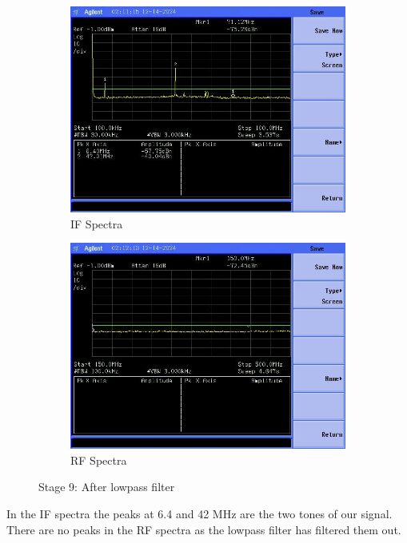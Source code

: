 \documentclass[letterpaper,12pt]{article}
\begin{document}
\begin{figure}[H]
	\begin{subfigure}[t]{.49\textwidth}
		\centering
		\includegraphics[width=\linewidth]{figures/receiver_spectra/9.lpf.lower}
		\caption{IF Spectra}
	  \end{subfigure}
	  \hfill
	  \begin{subfigure}[t]{.49\textwidth}
		\centering
		\includegraphics[width=\linewidth]{figures/receiver_spectra/9.lpf.upper}
		\caption{RF Spectra}
	  \end{subfigure}

	  \vspace{0.5cm}
	  \caption{Stage 9: After lowpass filter}
\end{figure}
In the IF spectra the peaks at 6.4 and 42 MHz are the two tones of our signal. There are no peaks in the RF spectra as the lowpass filter has filtered them out.
\end{document}
